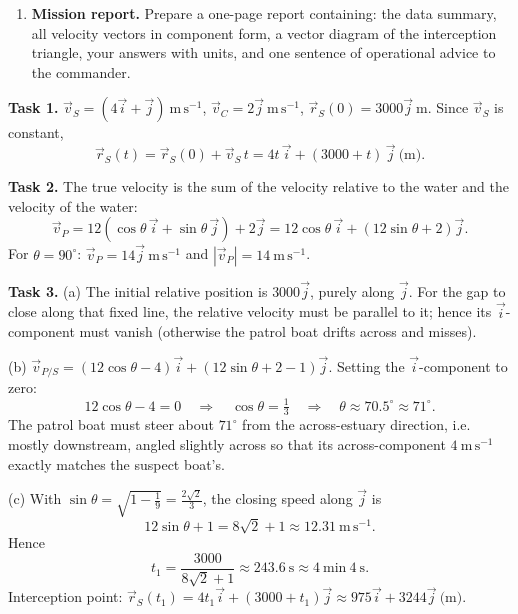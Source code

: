 \documentclass[11pt]{article}
\newcounter{popsec}
\newcounter{popsub}
\newcommand{\courssub}[1]{%
  \stepcounter{popsub}%
  \par\vspace{9pt}\noindent{\popxbold\fontsize{11.5}{13}\selectfont\color{popink}{\color{poporange}\thepopsec.\thepopsub}\hspace{6pt}#1}\par\nopagebreak\vspace{4pt}
}
\begin{document}
\begin{enumerate}
\begin{enumerate}
\item Find the time $t_2$ at which the distance between the boats is least, and the closest distance of approach $d_{\min}$. Will the patrol boat catch the suspect boat by this tactic?
\end{enumerate}
\item \textbf{Mission report.} Prepare a one-page report containing: the data summary, all velocity vectors in component form, a vector diagram of the interception triangle, your answers with units, and one sentence of operational advice to the commander.
\end{enumerate}

\courssub{Model answer}

\textbf{Task 1.} $\vec{v}_S=(4\vec{i}+\vec{j})\ \mathrm{m\,s^{-1}}$, $\vec{v}_C=2\vec{j}\ \mathrm{m\,s^{-1}}$, $\vec{r}_S(0)=3000\vec{j}\ \text{m}$. Since $\vec{v}_S$ is constant,
\[\vec{r}_S(t)=\vec{r}_S(0)+\vec{v}_S\,t=4t\,\vec{i}+(3000+t)\,\vec{j}\ \text{(m)}.\]

\textbf{Task 2.} The true velocity is the sum of the velocity relative to the water and the velocity of the water:
\[\vec{v}_P=12(\cos\theta\,\vec{i}+\sin\theta\,\vec{j})+2\vec{j}=12\cos\theta\,\vec{i}+(12\sin\theta+2)\vec{j}.\]
For $\theta=90^{\circ}$: $\vec{v}_P=14\vec{j}\ \mathrm{m\,s^{-1}}$ and $|\vec{v}_P|=14\ \mathrm{m\,s^{-1}}$.

\textbf{Task 3.} (a) The initial relative position is $3000\vec{j}$, purely along $\vec{j}$. For the gap to close along that fixed line, the relative velocity must be parallel to it; hence its $\vec{i}$-component must vanish (otherwise the patrol boat drifts across and misses).

(b) $\vec{v}_{P/S}=(12\cos\theta-4)\vec{i}+(12\sin\theta+2-1)\vec{j}$. Setting the $\vec{i}$-component to zero:
\[12\cos\theta-4=0\quad\Longrightarrow\quad \cos\theta=\tfrac{1}{3}\quad\Longrightarrow\quad \theta\approx 70.5^{\circ}\approx 71^{\circ}.\]
The patrol boat must steer about $71^{\circ}$ from the across-estuary direction, i.e. mostly downstream, angled slightly across so that its across-component $4\ \mathrm{m\,s^{-1}}$ exactly matches the suspect boat's.

(c) With $\sin\theta=\sqrt{1-\tfrac19}=\tfrac{2\sqrt2}{3}$, the closing speed along $\vec{j}$ is
\[12\sin\theta+1=8\sqrt2+1\approx 12.31\ \mathrm{m\,s^{-1}}.\]
Hence
\[t_1=\frac{3000}{8\sqrt2+1}\approx 243.6\ \text{s}\approx 4\ \text{min}\ 4\ \text{s}.\]
Interception point: $\vec{r}_S(t_1)=4t_1\vec{i}+(3000+t_1)\vec{j}\approx 975\vec{i}+3244\vec{j}\ \text{(m)}$.
\end{document}
